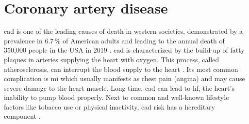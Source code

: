 \section{Coronary artery disease}
\label{sec:cad}
\Ac{cad} is one of the leading causes of death in western societies, demonstrated by a prevalence in 6.7\,\% of American adults and leading to the annual death of 350,000 people in the USA in 2019 \cite{centersfordiseasecontrolandpreventionHeartDiseaseFacts2022, fryarPrevalenceUncontrolledRisk2012}. \Ac{cad} is characterized by the build-up of fatty plaques in arteries supplying the heart with oxygen. This process, called atherosclerosis, can interrupt the blood supply to the heart \cite{nationalhealthserviceHeartAttack2017}. Its most common complication is \ac{mi} which usually manifests as chest pain (angina) and may cause severe damage to the heart muscle. Long time, \ac{cad} can lead to \ac{hf}, the heart's inability to pump blood properly. Next to common and well-known lifestyle factors like tobacco use or physical inactivity, \ac{cad} risk has a hereditary component \cite{montalescot2013ESCGuidelines2013}.


